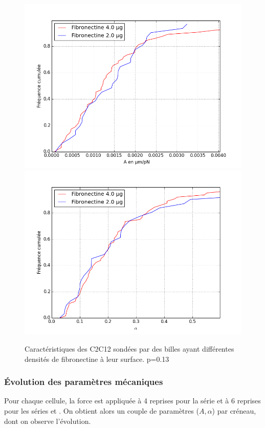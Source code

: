 \begin{figure}
\includegraphics[scale=0.5]{Figures/A_coating_seul.png} 
\includegraphics[scale=0.5]{Figures/E_coating_seul.png} 
\caption{Caractéristiques des C2C12 sondées par des billes ayant différentes densités de fibronectine à leur surface. p=0.13}
\end{figure}

\subsubsection{\'Evolution des paramètres mécaniques}

Pour chaque cellule, la force est appliquée à 4 reprises pour la série  et à 6 reprises pour les séries  et . On obtient alors un couple de paramètres ($A,\alpha$) par créneau, dont on observe l'évolution. 

